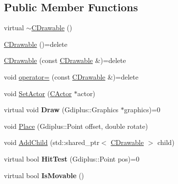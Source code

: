 \subsection*{Public Member Functions}
\begin{DoxyCompactItemize}
\item 
virtual \hyperlink{class_c_drawable_a58fd1036856d627b19976088e4143630}{$\sim$\+C\+Drawable} ()
\item 
\hyperlink{class_c_drawable_abd46d61baf3d5f5210aa3c66b98d9263}{C\+Drawable} ()=delete
\item 
\hyperlink{class_c_drawable_abec99c088c1a7c12e1d7ecae69135602}{C\+Drawable} (const \hyperlink{class_c_drawable}{C\+Drawable} \&)=delete
\item 
void \hyperlink{class_c_drawable_aabd5f52b903e57a4c8b145cb69158adb}{operator=} (const \hyperlink{class_c_drawable}{C\+Drawable} \&)=delete
\item 
void \hyperlink{class_c_drawable_a86762c6e220d9f502c6ccf9baf1135ac}{Set\+Actor} (\hyperlink{class_c_actor}{C\+Actor} $\ast$actor)
\item 
\hypertarget{class_c_drawable_a9b6a9920a75d88d9ae321997495eaec7}{}virtual void {\bfseries Draw} (Gdiplus\+::\+Graphics $\ast$graphics)=0\label{class_c_drawable_a9b6a9920a75d88d9ae321997495eaec7}

\item 
void \hyperlink{class_c_drawable_ac154be14313b739471d3a1529a2b31b5}{Place} (Gdiplus\+::\+Point offset, double rotate)
\item 
void \hyperlink{class_c_drawable_ab636167462699dde9b80e6dcb08caf7c}{Add\+Child} (std\+::shared\+\_\+ptr$<$ \hyperlink{class_c_drawable}{C\+Drawable} $>$ child)
\item 
\hypertarget{class_c_drawable_af715bc2e79788b2a44a74ad70b181544}{}virtual bool {\bfseries Hit\+Test} (Gdiplus\+::\+Point pos)=0\label{class_c_drawable_af715bc2e79788b2a44a74ad70b181544}

\item 
\hypertarget{class_c_drawable_ac9f03cfc58aed75fb52cd69c71e7b6e0}{}virtual bool {\bfseries Is\+Movable} ()\label{class_c_drawable_ac9f03cfc58aed75fb52cd69c71e7b6e0}


\end{DoxyCompactItemize}
